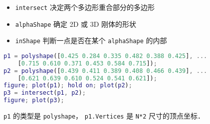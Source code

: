 
\begin{issues}
\issueDraft
\end{issues}

\begin{itemize}
\item \verb|intersect| 决定两个多边形重合部分的多边形
\item \verb|alphaShape| 确定 2D 或 3D 刚体的形状
\item \verb|inShape| 判断一点是否在某个 \verb|alphaShape| 的内部
\end{itemize}


\begin{lstlisting}[language=matlab]
p1 = polyshape([0.425 0.284 0.335 0.482 0.388 0.425], ...
    [0.715 0.610 0.371 0.453 0.584 0.715]);
p2 = polyshape([0.439 0.411 0.389 0.408 0.466 0.439], ...
    [0.621 0.639 0.610 0.524 0.541 0.621]);
figure; plot(p1); hold on; plot(p2);
p3 = intersect(p1, p2);
figure; plot(p3);
\end{lstlisting}
\verb|p1| 的类型是 \verb|polyshape|， \verb|p1.Vertices| 是 \verb|N*2| 尺寸的顶点坐标．
